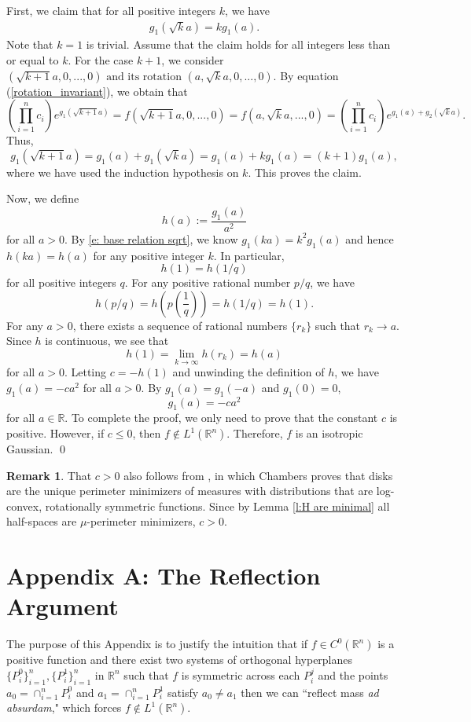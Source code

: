 \documentclass[12pt]{amsart}
\numberwithin{equation}{section}
\theoremstyle{plain}
\theoremstyle{definition}
\newtheorem{remark}[theorem]{Remark}
\begin{document}
First, we claim that for all positive integers $k$, we have
\begin{align}\label{e: base relation sqrt}
    g_1(\sqrt{k}a)=kg_1(a).
\end{align}
Note that $k=1$ is trivial.  Assume that the claim holds for all integers less than or equal to $k$. For the case $k+1$, we consider $(\sqrt{k+1}a,0,...,0)\mbox{ and its rotation } (a,\sqrt{k}a,0,...,0).$  By equation (\ref{rotation_invariant}), we obtain that
$$\left(\prod_{i=1}^nc_i\right)e^{g_1(\sqrt{k+1}a)}=f(\sqrt{k+1}a,0,...,0)=f(a,\sqrt{k}a,...,0)=\left(\prod_{i=1}^nc_i\right)e^{g_1(a)+g_2(\sqrt{k}a)}.$$
Thus, $$g_1(\sqrt{k+1}a)=g_1(a)+g_1(\sqrt{k}a)=g_1(a)+kg_1(a)=(k+1)g_1(a),$$
where we have used the induction hypothesis on $k$. This proves the claim.  

Now, we define
$$h(a):=\frac{g_1(a)}{a^2}$$
for all $a>0$. By \eqref{e: base relation sqrt}, we know $g_1(ka)=k^2g_1(a)$ and hence $h(ka)=h(a)$ for any positive integer $k$. In particular,
$$h(1)=h(1/q)$$
for all positive integers $q$. For any positive rational number $p/q$, we have
$$h(p/q)=h\left(p\left(\frac{1}{q}\right)\right)=h(1/q)=h(1).$$
For any $a>0$, there exists a sequence of rational numbers $\{r_k\}$ such that $r_k\to a$. Since $h$ is continuous, we see that
$$h(1)=\lim_{k\to \infty}h(r_k)=h(a)$$ for all $a>0$. Letting $c=-h(1)$ and unwinding the definition of $h$, we have $g_1(a)=-ca^2$ for all $a>0$. By $g_1(a)=g_1(-a)$ and $g_1(0)=0$,
$$g_1(a)=-ca^2$$
for all $a\in \mathbb{R}$. To complete the proof, we only need to prove that the constant $c$ is positive. However, if $c\le 0$, then $f \not \in L^1(\mathbb{R}^n)$.  Therefore, $f$ is an isotropic Gaussian. \qed

\begin{remark}
That $c>0$ also follows from \cite{Chambers19}, in which Chambers proves that disks are the unique perimeter minimizers of measures with distributions that are log-convex, rotationally symmetric functions. Since by Lemma \ref{l:H are minimal} all half-spaces are $\mu$-perimeter minimizers, $c>0$.
\end{remark}

\section{Appendix A: The Reflection Argument}\label{The Reflection Argument}

The purpose of this Appendix is to justify the intuition that if $f \in C^0(\mathbb{R}^n)$ is a positive function and there exist two systems of orthogonal hyperplanes $\{P_i^0\}_{i=1}^n, \{P_i^1 \}_{i=1}^n$ in $\mathbb{R}^n$ such that $f$ is symmetric across each $P^j_i$ and the points $a_0 = \cap_{i=1}^n P^0_i$ and $a_1 = \cap_{i=1}^n P_i^1$ satisfy $a_0 \not = a_1$ then we can ``reflect mass \textit{ad absurdam}," which forces $f \not \in L^1(\mathbb{R}^n)$.
\end{document}
